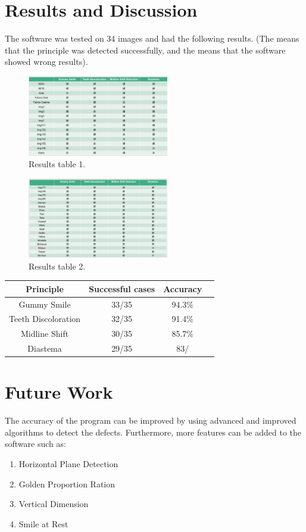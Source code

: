 \documentclass[conference,twocolumn]{IEEEtran}
\begin{document}
\section{Results and Discussion}
The software was tested on 34 images and had the following results. (The \checkmark means that the principle was detected successfully, and the  means that the software showed wrong results).

\begin{figure}[H]
    \centering
    \includegraphics[width=0.55\textwidth]{Screenshot_1.png}
    \caption{Results table 1.}
    \label{fig:my_label}
\end{figure}
\begin{figure}[H]
    \centering
    \includegraphics[width=0.55\textwidth]{Screenshot_2.png}
    \caption{Results table 2.}
    \label{fig:my_label}
\end{figure}
\begin{center}
\begin{tabular}{||c c c c||} 
 \hline
 Principle & Successful cases & Accuracy \\ [0.5ex] 
 \hline\hline
 Gummy Smile & 33/35 & 94.3\% \\
 \hline
 Teeth Discoloration & 32/35 & 91.4\% \\
 \hline
 Midline Shift & 30/35 & 85.7\% \\
 \hline
 Diastema & 29/35 & 83/& \\ [1ex] 
 \hline
\end{tabular}
\end{center}
\section{Future Work}
The accuracy of the program can be improved by using advanced and improved algorithms to detect the defects. Furthermore, more features can be added to the software such as:
\begin{enumerate}
    \item Horizontal Plane Detection
    \item Golden Proportion Ration
    \item Vertical Dimension 
    \item Smile at Rest
\end{enumerate}
\end{document}
